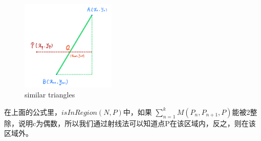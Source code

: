\begin{figure}[H] %
\centering %
\includegraphics[width=0.4\textwidth]{./img/similar_triangles.png} %
\caption{similar triangles} %
\label{Fig.main2} %
\end{figure}



在上面的公式里，$ isInRegion(N,P) $中，如果 $ \sum\limits_{n=1}^{k} M(P_n, P_{n+1},P) $能被2整除，说明c为偶数，所以我们通过射线法可以知道点P在该区域内，反之，则在该区域外。


%
%
%
%
%

    

